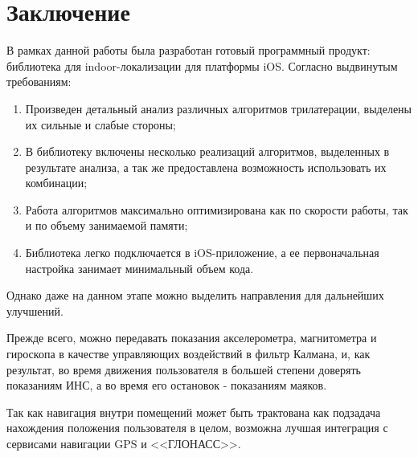 \section*{Заключение}

В рамках данной работы была разработан готовый программный продукт: библиотека для indoor-локализации для платформы iOS. Согласно выдвинутым требованиям:
\begin{enumerate}
    \item
    Произведен детальный анализ различных алгоритмов трилатерации, выделены их сильные и слабые стороны;
    \item
    В библиотеку включены несколько реализаций алгоритмов, выделенных в результате анализа, а так же предоставлена возможность использовать их комбинации;
    \item
    Работа алгоритмов максимально оптимизирована как по скорости работы, так и по объему занимаемой памяти;
    \item
    Библиотека легко подключается в iOS-приложение, а ее первоначальная настройка занимает минимальный объем кода.
\end{enumerate}

Однако даже на данном этапе можно выделить направления для дальнейших улучшений. 

Прежде всего, можно передавать показания акселерометра, магнитометра и гироскопа в качестве управляющих воздействий в фильтр Калмана, и, как результат, во время движения пользователя в большей степени доверять показаниям ИНС, а во время его остановок - показаниям маяков.

Так как навигация внутри помещений может быть трактована как подзадача нахождения положения пользователя в целом, возможна лучшая интеграция с сервисами навигации GPS и <<ГЛОНАСС>>.

